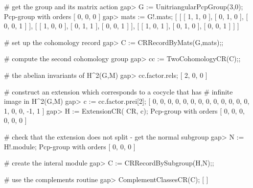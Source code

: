 \beginexample

# get the group and its matrix action
gap> G := UnitriangularPcpGroup(3,0);
Pcp-group with orders [ 0, 0, 0 ]
gap> mats := G!.mats;
[ [ [ 1, 1, 0 ], [ 0, 1, 0 ], [ 0, 0, 1 ] ],
  [ [ 1, 0, 0 ], [ 0, 1, 1 ], [ 0, 0, 1 ] ],
  [ [ 1, 0, 1 ], [ 0, 1, 0 ], [ 0, 0, 1 ] ] ]

# set up the cohomology record
gap> C := CRRecordByMats(G,mats);;

# compute the second cohomology group
gap> cc := TwoCohomologyCR(C);;

# the abelian invariants of H^2(G,M) 
gap> cc.factor.rels;
[ 2, 0, 0 ]

# construct an extension which corresponds to a cocycle that has
# infinite image in H^2(G,M)
gap> c := cc.factor.prei[2];
[ 0, 0, 0, 0, 0, 0, 0, 0, 0, 0, 0, 0, 0, 1, 0, 0, -1, 1 ]
gap> H := ExtensionCR( CR, c);
Pcp-group with orders [ 0, 0, 0, 0, 0, 0 ]

# check that the extension does not split - get the normal subgroup
gap> N := H!.module;
Pcp-group with orders [ 0, 0, 0 ]

# create the interal module
gap> C := CRRecordBySubgroup(H,N);;

# use the complements routine
gap> ComplementClassesCR(C);
[  ]
\endexample

